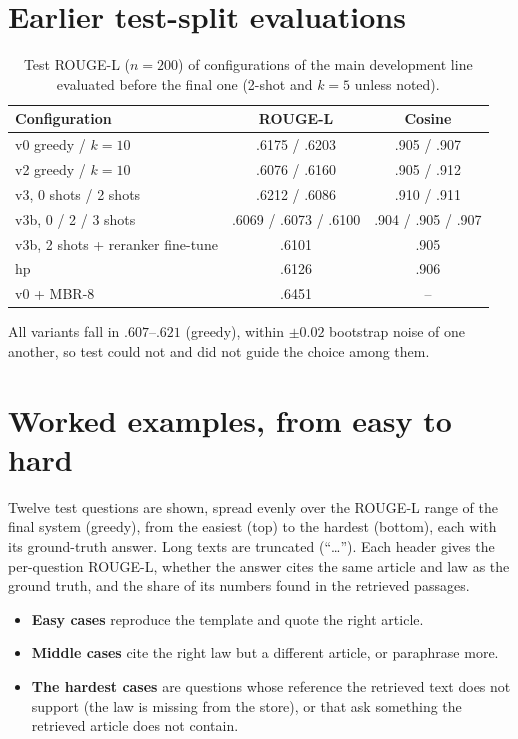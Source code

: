 \documentclass[11pt,a4paper]{article}
\newcommand{\rl}{ROUGE-L}
\begin{document}
\appendix
\section{Earlier test-split evaluations}\label{app:test}
\begin{table}[H]
\centering
\caption{Test \rl{} ($n{=}200$) of configurations of the main development line evaluated before the final one (2-shot and $k{=}5$ unless noted).}\label{tab:testold}
\begin{tabular}{@{}lcc@{}}
\toprule
Configuration & \rl{} & Cosine\\
\midrule
v0 greedy / $k{=}10$ & .6175 / .6203 & .905 / .907\\
v2 greedy / $k{=}10$ & .6076 / .6160 & .905 / .912\\
v3, 0 shots / 2 shots & .6212 / .6086 & .910 / .911\\
v3b, 0 / 2 / 3 shots & .6069 / .6073 / .6100 & .904 / .905 / .907\\
v3b, 2 shots + reranker fine-tune & .6101 & .905\\
hp & .6126 & .906\\
v0 + MBR-8 & .6451 & --\\
\bottomrule
\end{tabular}
\end{table}
All variants fall in $.607$--$.621$ (greedy), within $\pm0.02$ bootstrap noise of one another, so test could not and did not guide the choice among them.

\section{Worked examples, from easy to hard}\label{app:examples}
Twelve test questions are shown, spread evenly over the \rl{} range of the final system (greedy), from the easiest (top) to the hardest (bottom), each with its ground-truth answer. Long texts are truncated (``\ldots''). Each header gives the per-question \rl{}, whether the answer cites the same article and law as the ground truth, and the share of its numbers found in the retrieved passages.
\begin{itemize}[leftmargin=*]
\item \textbf{Easy cases} reproduce the template and quote the right article.
\item \textbf{Middle cases} cite the right law but a different article, or paraphrase more.
\item \textbf{The hardest cases} are questions whose reference the retrieved text does not support (the law is missing from the store), or that ask something the retrieved article does not contain.
\end{itemize}

\end{document}
